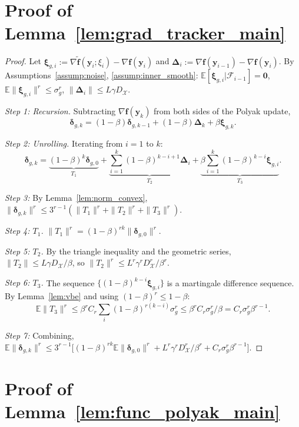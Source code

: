 \documentclass{article}
\newcommand{\cX}{\mathcal{X}}
\def\vf{{\bm{f}}}
\def\vy{{\bm{y}}}
\newcommand{\E}{\mathbb{E}}
\begin{document}
\section{Proof of Lemma~\ref{lem:grad_tracker_main}} \label{sec:proof_grad}

\begin{proof}
Let $\bm{\xi}_{g,i} := \nabla \tilde \vf(\vy_i; \xi_i) - \nabla \vf(\vy_i)$ and $\bm{\Delta}_i := \nabla \vf(\vy_{i-1}) - \nabla \vf(\vy_i)$. By Assumptions~\ref{assump:noise}, \ref{assump:inner_smooth}: $\E[\bm\xi_{g,i} | \mathcal{F}_{i-1}] = \mathbf{0}$, $\E\|\bm\xi_{g,i}\|^r \le \sigma_g^r$, $\|\bm\Delta_i\| \le L\gamma D_\cX$.

\emph{Step 1: Recursion.} Subtracting $\nabla \vf(\vy_k)$ from both sides of the Polyak update,
\[
\bm{\delta}_{g,k} = (1-\beta)\bm{\delta}_{g,k-1} + (1-\beta) \bm{\Delta}_k + \beta \bm{\xi}_{g,k}.
\]

\emph{Step 2: Unrolling.} Iterating from $i = 1$ to $k$:
\[
\bm{\delta}_{g,k} = \underbrace{(1-\beta)^k \bm{\delta}_{g,0}}_{T_1} + \underbrace{\sum_{i=1}^k (1-\beta)^{k-i+1} \bm\Delta_i}_{T_2} + \underbrace{\beta \sum_{i=1}^k (1-\beta)^{k-i} \bm\xi_{g,i}}_{T_3}.
\]

\emph{Step 3:} By Lemma~\ref{lem:norm_convex}, $\|\bm\delta_{g,k}\|^r \le 3^{r-1}(\|T_1\|^r + \|T_2\|^r + \|T_3\|^r)$.

\emph{Step 4: $T_1$.} $\|T_1\|^r = (1-\beta)^{rk} \|\bm\delta_{g,0}\|^r$.

\emph{Step 5: $T_2$.} By the triangle inequality and the geometric series, $\|T_2\| \le L\gamma D_\cX/\beta$, so $\|T_2\|^r \le L^r\gamma^r D_\cX^r/\beta^r$.

\emph{Step 6: $T_3$.} The sequence $\{(1-\beta)^{k-i}\bm\xi_{g,i}\}$ is a martingale difference sequence. By Lemma~\ref{lem:vbe} and using $(1-\beta)^r \le 1-\beta$:
\[
\E\|T_3\|^r \le \beta^r C_r \sum_i (1-\beta)^{r(k-i)} \sigma_g^r \le \beta^r C_r \sigma_g^r / \beta = C_r \sigma_g^r \beta^{r-1}.
\]

\emph{Step 7:} Combining, $\E\|\bm\delta_{g,k}\|^r \le 3^{r-1}\big[(1-\beta)^{rk}\E\|\bm\delta_{g,0}\|^r + L^r\gamma^r D_\cX^r/\beta^r + C_r \sigma_g^r \beta^{r-1}\big]$.
\end{proof}

\section{Proof of Lemma~\ref{lem:func_polyak_main}} \label{sec:proof_polyak}
\end{document}
